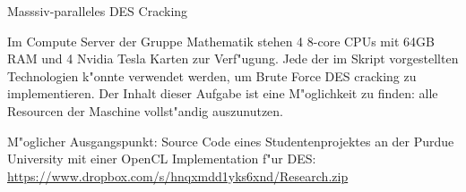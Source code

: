 \begin{aufgabe}
Masssiv-paralleles DES Cracking
\end{aufgabe}

Im Compute Server der Gruppe Mathematik stehen 4 8-core CPUs mit
64GB RAM und 4 Nvidia Tesla Karten zur Verf"ugung.
Jede der im Skript vorgestellten Technologien k"onnte verwendet
werden, um Brute Force DES cracking zu implementieren.
Der Inhalt dieser Aufgabe ist eine M"oglichkeit zu finden: alle
Resourcen der Maschine vollst"andig auszunutzen.


M"oglicher Ausgangspunkt:
Source Code eines Studentenprojektes an der Purdue University mit
einer OpenCL Implementation f"ur DES:
\url{https://www.dropbox.com/s/hnqxmdd1yks6xnd/Research.zip}
